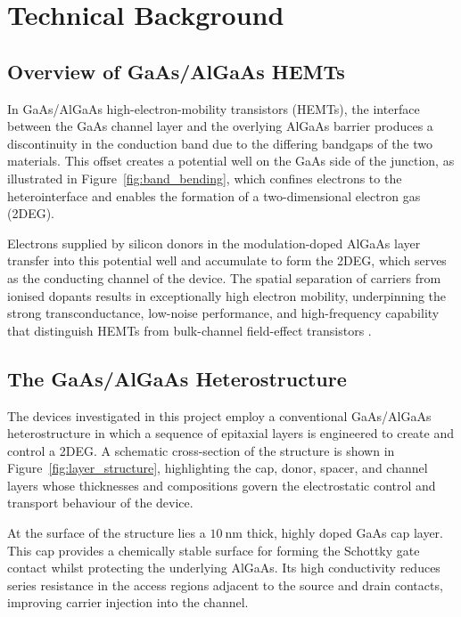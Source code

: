 \chapter{Technical Background}
\label{chap:technical_background}

\section{Overview of GaAs/AlGaAs HEMTs}

In GaAs/AlGaAs high-electron-mobility transistors (HEMTs), the interface
between the GaAs channel layer and the overlying AlGaAs barrier produces
a discontinuity in the conduction band due to the differing bandgaps of
the two materials. This offset creates a potential well on the GaAs side
of the junction, as illustrated in Figure~\ref{fig:band_bending}, which
confines electrons to the heterointerface and enables the formation of a
two-dimensional electron gas (2DEG).

Electrons supplied by silicon donors in the modulation-doped AlGaAs
layer transfer into this potential well and accumulate to form the
2DEG, which serves as the conducting channel of the device. The spatial
separation of carriers from ionised dopants results in exceptionally
high electron mobility, underpinning the strong transconductance,
low-noise performance, and high-frequency capability that distinguish
HEMTs from bulk-channel field-effect transistors \cite{liu1999}.



\section{The GaAs/AlGaAs Heterostructure}

The devices investigated in this project employ a conventional
GaAs/AlGaAs heterostructure in which a sequence of epitaxial layers is
engineered to create and control a 2DEG. A schematic cross-section of
the structure is shown in Figure~\ref{fig:layer_structure}, highlighting
the cap, donor, spacer, and channel layers whose thicknesses and
compositions govern the electrostatic control and transport behaviour of
the device.

\vspace{2mm}

\vspace{5mm}

At the surface of the structure lies a $10~\text{nm}$ thick, highly doped
GaAs cap layer. This cap provides a chemically stable surface for
forming the Schottky gate contact whilst protecting the underlying
AlGaAs. Its high conductivity reduces series resistance in the access
regions adjacent to the source and drain contacts, improving carrier
injection into the channel.

